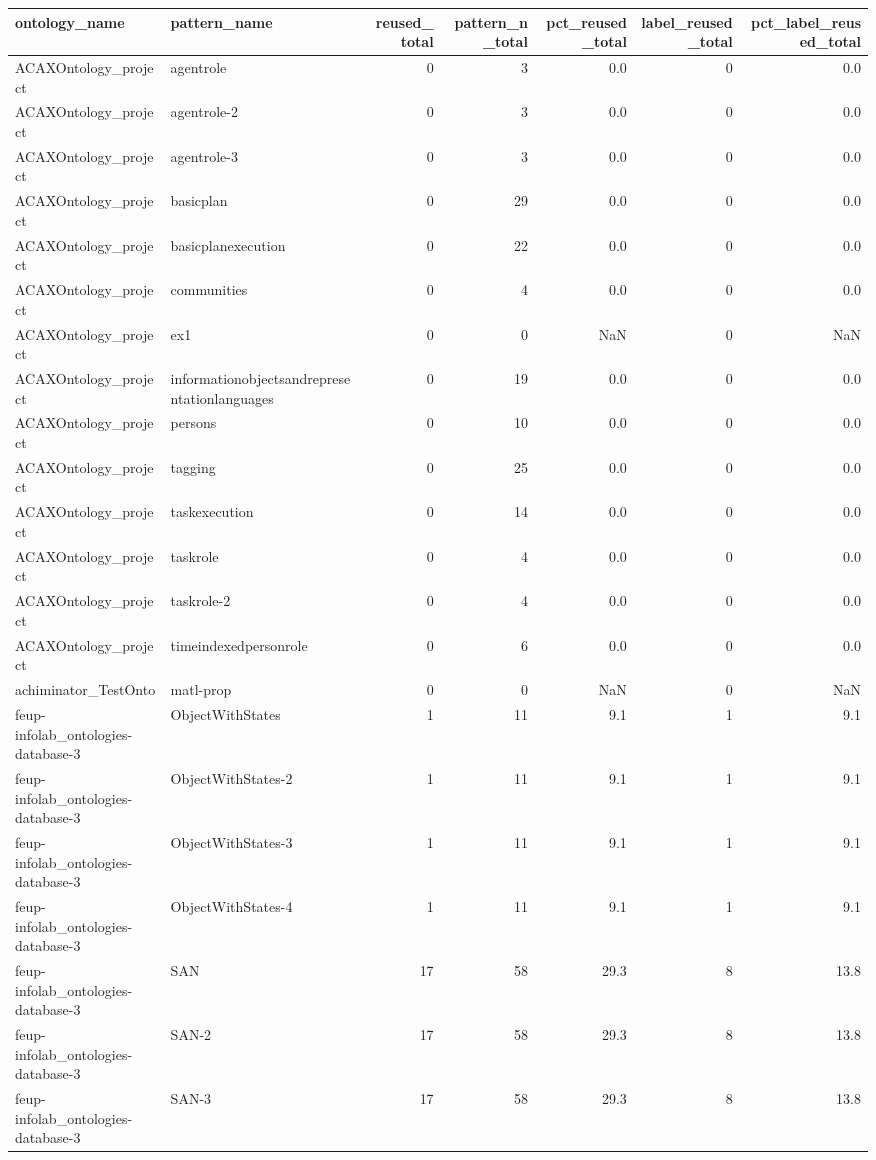\begin{tabular}{llrrrrr}
\toprule
ontology_name & pattern_name & reused_total & pattern_n_total & pct_reused_total & label_reused_total & pct_label_reused_total \\
\midrule
ACAXOntology_project & agentrole & 0 & 3 & 0.0 & 0 & 0.0 \\
ACAXOntology_project & agentrole-2 & 0 & 3 & 0.0 & 0 & 0.0 \\
ACAXOntology_project & agentrole-3 & 0 & 3 & 0.0 & 0 & 0.0 \\
ACAXOntology_project & basicplan & 0 & 29 & 0.0 & 0 & 0.0 \\
ACAXOntology_project & basicplanexecution & 0 & 22 & 0.0 & 0 & 0.0 \\
ACAXOntology_project & communities & 0 & 4 & 0.0 & 0 & 0.0 \\
ACAXOntology_project & ex1 & 0 & 0 & NaN & 0 & NaN \\
ACAXOntology_project & informationobjectsandrepresentationlanguages & 0 & 19 & 0.0 & 0 & 0.0 \\
ACAXOntology_project & persons & 0 & 10 & 0.0 & 0 & 0.0 \\
ACAXOntology_project & tagging & 0 & 25 & 0.0 & 0 & 0.0 \\
ACAXOntology_project & taskexecution & 0 & 14 & 0.0 & 0 & 0.0 \\
ACAXOntology_project & taskrole & 0 & 4 & 0.0 & 0 & 0.0 \\
ACAXOntology_project & taskrole-2 & 0 & 4 & 0.0 & 0 & 0.0 \\
ACAXOntology_project & timeindexedpersonrole & 0 & 6 & 0.0 & 0 & 0.0 \\
achiminator_TestOnto & matl-prop & 0 & 0 & NaN & 0 & NaN \\
feup-infolab_ontologies-database-3 & ObjectWithStates & 1 & 11 & 9.1 & 1 & 9.1 \\
feup-infolab_ontologies-database-3 & ObjectWithStates-2 & 1 & 11 & 9.1 & 1 & 9.1 \\
feup-infolab_ontologies-database-3 & ObjectWithStates-3 & 1 & 11 & 9.1 & 1 & 9.1 \\
feup-infolab_ontologies-database-3 & ObjectWithStates-4 & 1 & 11 & 9.1 & 1 & 9.1 \\
feup-infolab_ontologies-database-3 & SAN & 17 & 58 & 29.3 & 8 & 13.8 \\
feup-infolab_ontologies-database-3 & SAN-2 & 17 & 58 & 29.3 & 8 & 13.8 \\
feup-infolab_ontologies-database-3 & SAN-3 & 17 & 58 & 29.3 & 8 & 13.8 \\

\end{tabular}

